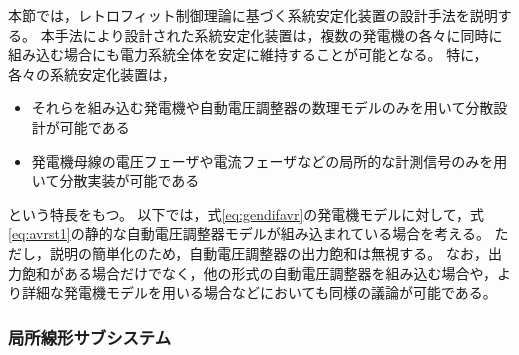 \documentclass[tombow,dvipdfmx]{corona-a5-1.1}
\begin{document}
本節では，レトロフィット制御理論に基づく系統安定化装置の設計手法を説明する\cite{ishizaki2018retrofit,sadamoto2018retrofit,sasahara2019damping,ishizaki2019retrofit,ishizaki2021modularity}。
本手法により設計された系統安定化装置は，複数の発電機の各々に同時に組み込む場合にも電力系統全体を安定に維持することが可能となる。
特に，各々の系統安定化装置は，
\begin{itemize}
\item それらを組み込む発電機や自動電圧調整器の数理モデルのみを用いて分散設計が可能である
\item 発電機母線の電圧フェーザや電流フェーザなどの局所的な計測信号のみを用いて分散実装が可能である
\end{itemize}
という特長をもつ。
以下では，式\ref{eq:gendifavr}の発電機モデルに対して，式\ref{eq:avrst1}の静的な自動電圧調整器モデルが組み込まれている場合を考える。
ただし，説明の簡単化のため，自動電圧調整器の出力飽和は無視する。
なお，出力飽和がある場合だけでなく，他の形式の自動電圧調整器を組み込む場合や，より詳細な発電機モデルを用いる場合などにおいても同様の議論が可能である。


\subsubsection{局所線形サブシステム}
\end{document}
